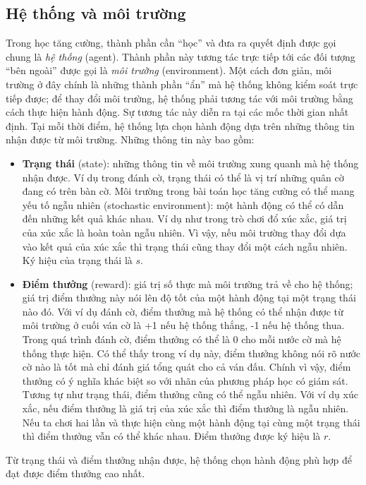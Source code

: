 \subsection{Hệ thống và môi trường}
Trong học tăng cường, thành phần cần ``học'' và đưa ra quyết định được gọi chung là \textit{hệ thống} (agent).
Thành phần này tương tác trực tiếp tới các đối tượng ``bên ngoài'' được gọi là \textit{môi trường} (environment).
Một cách đơn giản, môi trường ở đây chính là những thành phần ``ẩn'' mà hệ thống không kiểm soát trực tiếp được; để thay đổi môi trường, hệ thống phải tương tác với môi trường bằng cách thực hiện hành động.
Sự tương tác này diễn ra tại các mốc thời gian nhất định.
Tại mỗi thời điểm, hệ thống lựa chọn hành động dựa trên những thông tin nhận được từ môi trường.
Những thông tin này bao gồm:
\begin{itemize}
	\item \textbf{Trạng thái} (state): những thông tin về môi trường xung quanh mà hệ thống nhận được. 
	Ví dụ trong đánh cờ, trạng thái có thể là vị trí những quân cờ đang có trên bàn cờ. 
	Môi trường trong bài toán học tăng cường có thể mang yếu tố ngẫu nhiên (stochastic environment): một hành động có thể có dẫn đến những kết quả khác nhau.
	Ví dụ như trong trò chơi đổ xúc xắc, giá trị của xúc xắc là hoàn toàn ngẫu nhiên.
	Vì vậy, nếu môi trường thay đổi dựa vào kết quả của xúc xắc thì trạng thái cũng thay đổi một cách ngẫu nhiên.
	Ký hiệu của trạng thái là $s$.
	\item \textbf{Điểm thưởng} (reward): giá trị số thực mà môi trường trả về cho hệ thống; giá trị điểm thưởng này nói lên độ tốt của một hành động tại một trạng thái nào đó. 
	Với ví dụ đánh cờ, điểm thưởng mà hệ thống có thể nhận được từ môi trường ở cuối ván cờ là +1 nếu hệ thống thắng, -1 nếu hệ thống thua.
	Trong quá trình đánh cờ, điểm thưởng có thể là 0 cho mỗi nước cờ mà hệ thống thực hiện.
	Có thể thấy trong ví dụ này, điểm thưởng không nói rõ nước cờ nào là tốt mà chỉ đánh giá tổng quát cho cả ván đấu.
	Chính vì vậy, điểm thưởng có ý nghĩa khác biệt so với nhãn của phương pháp học có giám sát.
	Tương tự như trạng thái, điểm thưởng cũng có thể ngẫu nhiên.
	Với ví dụ xúc xắc, nếu điểm thưởng là giá trị của xúc xắc thì điểm thưởng là ngẫu nhiên.
	Nếu ta chơi hai lần và thực hiện cùng một hành động tại cùng một trạng thái thì điểm thưởng vẫn có thể khác nhau.
	Điểm thưởng được ký hiệu là $r$. 
\end{itemize}
Từ trạng thái và điểm thưởng nhận được, hệ thống chọn hành động phù hợp để đạt được điểm thưởng cao nhất.

